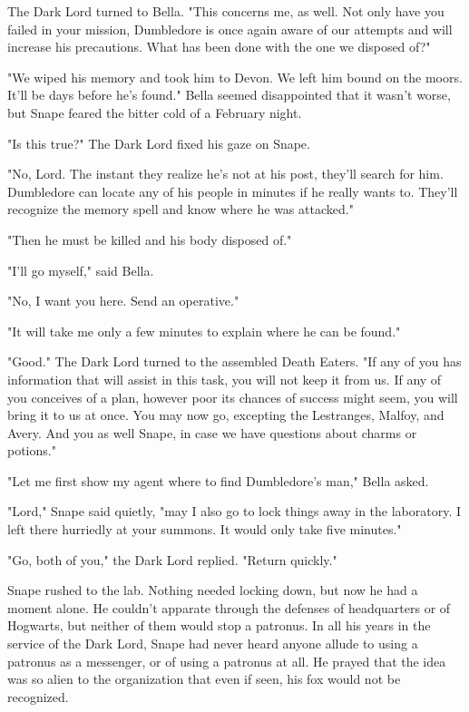 The Dark Lord turned to Bella. "This concerns me, as well. Not only have you failed in your mission, Dumbledore is once again aware of our attempts and will increase his precautions. What has been done with the one we disposed of?"

"We wiped his memory and took him to Devon. We left him bound on the moors. It'll be days before he's found." Bella seemed disappointed that it wasn't worse, but Snape feared the bitter cold of a February night.

"Is this true?" The Dark Lord fixed his gaze on Snape.

"No, Lord. The instant they realize he's not at his post, they'll search for him. Dumbledore can locate any of his people in minutes if he really wants to. They'll recognize the memory spell and know where he was attacked."

"Then he must be killed and his body disposed of."

"I'll go myself," said Bella.

"No, I want you here. Send an operative."

"It will take me only a few minutes to explain where he can be found."

"Good." The Dark Lord turned to the assembled Death Eaters. "If any of you has information that will assist in this task, you will not keep it from us. If any of you conceives of a plan, however poor its chances of success might seem, you will bring it to us at once. You may now go, excepting the Lestranges, Malfoy, and Avery. And you as well Snape, in case we have questions about charms or potions."

"Let me first show my agent where to find Dumbledore's man," Bella asked.

"Lord," Snape said quietly, "may I also go to lock things away in the laboratory. I left there hurriedly at your summons. It would only take five minutes."

"Go, both of you," the Dark Lord replied. "Return quickly."

Snape rushed to the lab. Nothing needed locking down, but now he had a moment alone. He couldn't apparate through the defenses of headquarters or of Hogwarts, but neither of them would stop a patronus. In all his years in the service of the Dark Lord, Snape had never heard anyone allude to using a patronus as a messenger, or of using a patronus at all. He prayed that the idea was so alien to the organization that even if seen, his fox would not be recognized.

